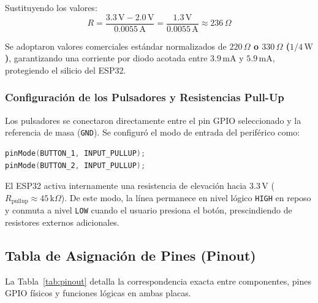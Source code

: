 \documentclass[11pt,a4paper]{article}
\begin{document}
Sustituyendo los valores:
\begin{equation}
    R = \frac{3.3\,\text{V} - 2.0\,\text{V}}{0.0055\,\text{A}} = \frac{1.3\,\text{V}}{0.0055\,\text{A}} \approx 236\,\Omega
\end{equation}

Se adoptaron valores comerciales estándar normalizados de \textbf{$220\,\Omega$ o $330\,\Omega$ ($1/4\,\text{W}$)}, garantizando una corriente por diodo acotada entre $3.9\,\text{mA}$ y $5.9\,\text{mA}$, protegiendo el silicio del ESP32.

\subsubsection{Configuración de los Pulsadores y Resistencias Pull-Up}
Los pulsadores se conectaron directamente entre el pin GPIO seleccionado y la referencia de masa (\texttt{GND}). Se configuró el modo de entrada del periférico como:
\begin{lstlisting}[language=C++]
pinMode(BUTTON_1, INPUT_PULLUP);
pinMode(BUTTON_2, INPUT_PULLUP);
\end{lstlisting}
El ESP32 activa internamente una resistencia de elevación hacia $3.3\,\text{V}$ ($R_{\text{pullup}} \approx 45\,\text{k}\Omega$). De este modo, la línea permanece en nivel lógico \texttt{HIGH} en reposo y conmuta a nivel \texttt{LOW} cuando el usuario presiona el botón, prescindiendo de resistores externos adicionales.

\subsection{Tabla de Asignación de Pines (Pinout)}
La Tabla~\ref{tab:pinout} detalla la correspondencia exacta entre componentes, pines GPIO físicos y funciones lógicas en ambas placas.
\end{document}

